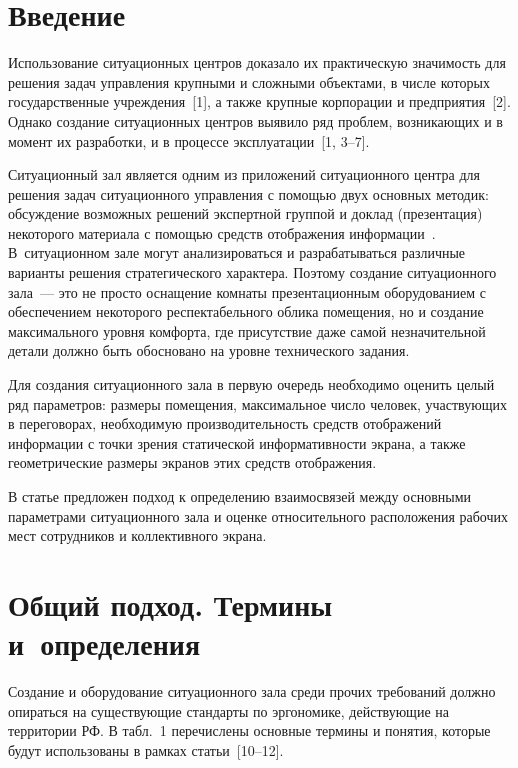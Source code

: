       \begin{multicols}{2}

      \label{st\stat}



\section{Введение}
    
    Использование ситуационных центров доказало их практическую 
значимость для решения задач управления крупными и сложными 
объектами, в числе которых государственные учреждения~[1], а также 
крупные корпорации и предприятия~[2]. Однако создание ситуационных 
центров выявило ряд проблем, возникающих и в момент их разработки, и в 
процессе эксплуатации~[1, 3--7].

Ситуационный зал является одним из приложений ситуационного центра для 
решения задач ситуационного управления с помощью двух основных 
методик: обсуждение возможных решений экспертной группой и доклад 
(презентация) некоторого материала с помощью средств отображения 
информации~\cite{8chu, 9chu}. В~ситуационном зале могут анализироваться 
и разрабатываться различные варианты решения стратегического характера. 
Поэтому создание ситуационного зала~--- это не просто оснащение комнаты 
презентационным оборудованием с обеспечением некоторого 
респектабельного облика помещения, но и создание максимального уровня 
комфорта, где присутствие даже самой незначительной детали должно быть 
обосновано на уровне технического задания.

Для создания ситуационного зала в первую очередь необходимо оценить 
целый ряд параметров: размеры помещения, максимальное число человек, 
участвующих в переговорах, необходимую производительность средств 
отображений информации с точки зрения статической информативности 
экрана, а также геометрические размеры экранов этих средств отображения.

В статье предложен подход к определению взаимосвязей между основными 
параметрами ситуационного зала и оценке относительного расположения 
рабочих мест сотрудников и коллективного экрана.    

\section{Общий подход. Термины и~определения}

Создание и оборудование ситуационного зала среди прочих требований 
должно опираться на существующие стандарты по эргономике, действующие 
на территории РФ. В табл.~1 перечислены основные термины и понятия, 
которые будут использованы в рамках статьи~[10--12].


\end{multicols}
